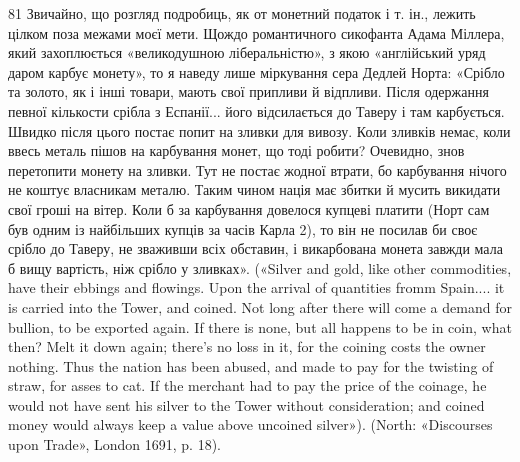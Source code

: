 81    Звичайно, що розгляд подробиць, як от монетний податок і т. ін.,
лежить цілком поза межами моєї мети. Щождо романтичного сикофанта
Адама Міллера, який захоплюється «великодушною ліберальністю», з
якою «англійський уряд даром карбує монету», то я наведу лише міркування
сера Дедлей Норта: «Срібло та золото, як і інші товари, мають свої
припливи й відпливи. Після одержання певної кількости срібла з Еспанії...
його відсилається до Таверу і там карбується. Швидко після цього постає
попит на зливки для вивозу. Коли зливків немає, коли ввесь металь пішов
на карбування монет, що тоді робити? Очевидно, знов перетопити монету
на зливки. Тут не постає жодної втрати, бо карбування нічого не коштує
власникам металю. Таким чином нація має збитки й мусить викидати
свої гроші на вітер. Коли б за карбування довелося купцеві платити
(Норт сам був одним із найбільших купців за часів Карла 2), то він не
посилав би своє срібло до Таверу, не зваживши всіх обставин, і викарбована
монета завжди мала б вищу вартість, ніж срібло у зливках». («Silver
and gold, like other commodities, have their ebbings and flowings. Upon
the arrival of quantities fromm Spain.... it is carried into the Tower, and
coined. Not long after there will come a demand for bullion, to be exported
again. If there is none, but all happens to be in coin, what then? Melt
it down again; there’s no loss in it, for the coining costs the owner nothing.
Thus the nation has been abused, and made to pay for the twisting of
straw, for asses to cat. If the merchant had to pay the price of the coinage,
he would not have sent his silver to the Tower without consideration; and
coined money would always keep a value above uncoined silver»). (North:
«Discourses upon Trade», London 1691, p. 18).
